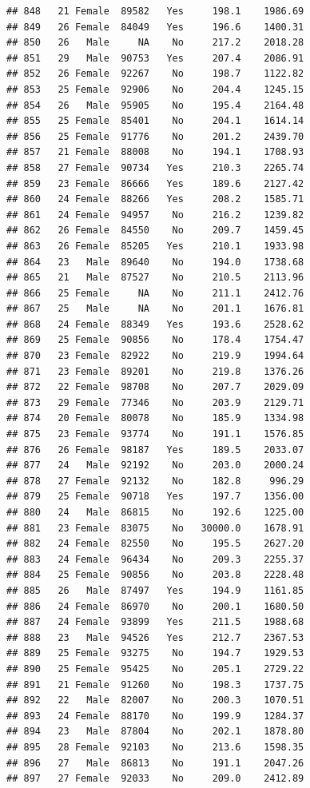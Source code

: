 \documentclass[12pt,]{krantz}
\theoremstyle{definition}
\theoremstyle{definition}
\theoremstyle{remark}
\begin{document}
\begin{verbatim}
## 848   21 Female  89582   Yes     198.1    1986.69
## 849   26 Female  84049   Yes     196.6    1400.31
## 850   26   Male     NA    No     217.2    2018.28
## 851   29   Male  90753   Yes     207.4    2086.91
## 852   26 Female  92267    No     198.7    1122.82
## 853   25 Female  92906    No     204.4    1245.15
## 854   26   Male  95905    No     195.4    2164.48
## 855   25 Female  85401    No     204.1    1614.14
## 856   25 Female  91776    No     201.2    2439.70
## 857   21 Female  88008    No     194.1    1708.93
## 858   27 Female  90734   Yes     210.3    2265.74
## 859   23 Female  86666   Yes     189.6    2127.42
## 860   24 Female  88266   Yes     208.2    1585.71
## 861   24 Female  94957    No     216.2    1239.82
## 862   26 Female  84550    No     209.7    1459.45
## 863   26 Female  85205   Yes     210.1    1933.98
## 864   23   Male  89640    No     194.0    1738.68
## 865   21   Male  87527    No     210.5    2113.96
## 866   25 Female     NA    No     211.1    2412.76
## 867   25   Male     NA    No     201.1    1676.81
## 868   24 Female  88349   Yes     193.6    2528.62
## 869   25 Female  90856    No     178.4    1754.47
## 870   23 Female  82922    No     219.9    1994.64
## 871   23 Female  89201    No     219.8    1376.26
## 872   22 Female  98708    No     207.7    2029.09
## 873   29 Female  77346    No     203.9    2129.71
## 874   20 Female  80078    No     185.9    1334.98
## 875   23 Female  93774    No     191.1    1576.85
## 876   26 Female  98187   Yes     189.5    2033.07
## 877   24   Male  92192    No     203.0    2000.24
## 878   27 Female  92132    No     182.8     996.29
## 879   25 Female  90718   Yes     197.7    1356.00
## 880   24   Male  86815    No     192.6    1225.00
## 881   23 Female  83075    No   30000.0    1678.91
## 882   24 Female  82550    No     195.5    2627.20
## 883   24 Female  96434    No     209.3    2255.37
## 884   25 Female  90856    No     203.8    2228.48
## 885   26   Male  87497   Yes     194.9    1161.85
## 886   24 Female  86970    No     200.1    1680.50
## 887   24 Female  93899   Yes     211.5    1988.68
## 888   23   Male  94526   Yes     212.7    2367.53
## 889   25 Female  93275    No     194.7    1929.53
## 890   25 Female  95425    No     205.1    2729.22
## 891   21 Female  91260    No     198.3    1737.75
## 892   22   Male  82007    No     200.3    1070.51
## 893   24 Female  88170    No     199.9    1284.37
## 894   23   Male  87804    No     202.1    1878.80
## 895   28 Female  92103    No     213.6    1598.35
## 896   27   Male  86813    No     191.1    2047.26
## 897   27 Female  92033    No     209.0    2412.89

\end{verbatim}
\end{document}
